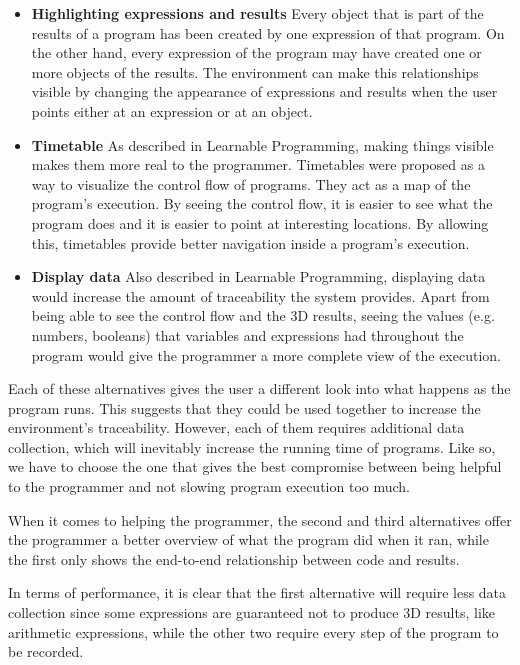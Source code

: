 \begin{itemize}
  \item {\bf Highlighting expressions and results} Every object that is part of the results of a program has been created by one expression of that program.
  On the other hand, every expression of the program may have created one or more objects of the results.
  The environment can make this relationships visible by changing the appearance of expressions and results when the user points either at an expression or at an object.

  \item {\bf Timetable} As described in Learnable Programming\cite{victor2012learnable}, making things visible makes them more real to the programmer.
  Timetables were proposed as a way to visualize the control flow of programs.
  They act as a map of the program's execution.
  By seeing the control flow, it is easier to see what the program does and it is easier to point at interesting locations.
  By allowing this, timetables provide better navigation inside a program's execution.

  \item {\bf Display data} Also described in Learnable Programming\cite{victor2012learnable}, displaying data would increase the amount of traceability the system provides.
  Apart from being able to see the control flow and the 3D results, seeing the values (e.g. numbers, booleans) that variables and expressions had throughout the program would give the programmer a more complete view of the execution.
\end{itemize}

Each of these alternatives gives the user a different look into what happens as the program runs.
This suggests that they could be used together to increase the environment's traceability.
However, each of them requires additional data collection, which will inevitably increase the running time of programs.
Like so, we have to choose the one that gives the best compromise between being helpful to the programmer and not slowing program execution too much.

When it comes to helping the programmer, the second and third alternatives offer the programmer a better overview of what the program did when it ran, while the first only shows the end-to-end relationship between code and results.

In terms of performance, it is clear that the first alternative will require less data collection since some expressions are guaranteed not to produce 3D results, like arithmetic expressions, while the other two require every step of the program to be recorded.

